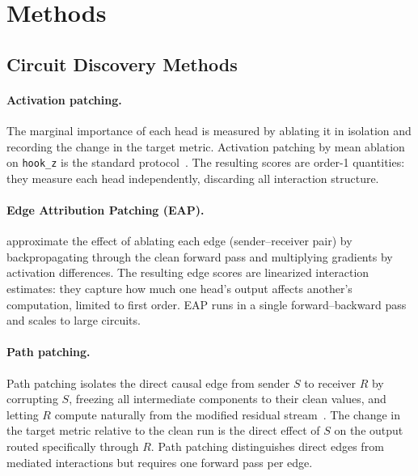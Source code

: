 \documentclass{article}
\begin{document}



\appendix

\section{Methods}


\subsection{Circuit Discovery Methods}
\label{sec:discovery-methods}

\paragraph{Activation patching.}

The marginal importance of each head is measured by ablating it in
isolation and recording the change in the target metric. Activation
patching by mean ablation on \texttt{hook\_z} is the standard
protocol~\citep{wang2022ioi}. The resulting scores are order-1
quantities: they measure each head independently, discarding all
interaction structure.

\paragraph{Edge Attribution Patching (EAP).}

\citet{syed2023attribution} approximate the effect of ablating each
edge (sender--receiver pair) by backpropagating through the clean
forward pass and multiplying gradients by activation differences. The
resulting edge scores are linearized interaction estimates: they
capture how much one head's output affects another's computation,
limited to first order. EAP runs in a single forward--backward pass and
scales to large circuits.

\paragraph{Path patching.}

Path patching isolates the direct causal edge from sender $S$ to
receiver $R$ by corrupting $S$, freezing all intermediate components to
their clean values, and letting $R$ compute naturally from the modified
residual stream~\citep{wang2022ioi}. The change in the target metric
relative to the clean run is the direct effect of $S$ on the output
routed specifically through $R$. Path patching distinguishes direct
edges from mediated interactions but requires one forward pass per edge.
\end{document}
